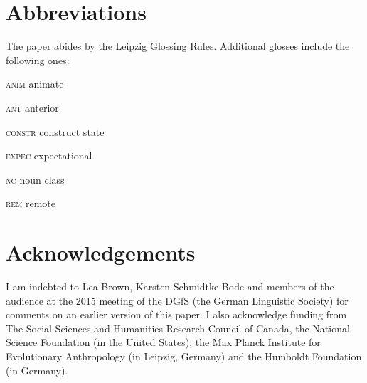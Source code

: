 \documentclass[output=paper]{langsci/langscibook}
\begin{document}
\section{Abbreviations}

The paper abides by the Leipzig Glossing Rules. Additional glosses include the following ones:


\textsc{anim}  animate



\textsc{ant}  anterior



\textsc{constr}  construct state



\textsc{expec}  expectational



\textsc{nc}  noun class



\textsc{rem}  remote


\section{Acknowledgements}

I am indebted to Lea Brown, Karsten Schmidtke-Bode and members of the audience at the 2015 meeting of the DGfS (the German Linguistic Society) for comments on an earlier version of this paper. I also acknowledge funding from The Social Sciences and Humanities Research Council of Canada, the National Science Foundation (in the United States), the Max Planck Institute for Evolutionary Anthropology (in Leipzig, Germany) and the Humboldt Foundation (in Germany).


\sloppy
\printbibliography[heading=subbibliography,notkeyword=this] 
\end{document}
